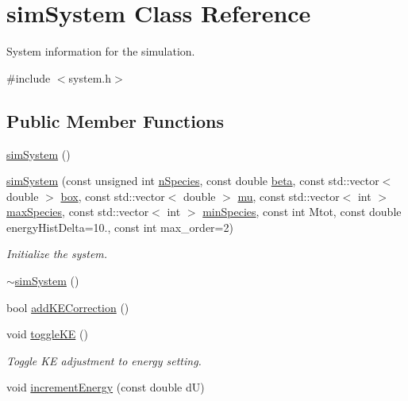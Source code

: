 \hypertarget{classsim_system}{\section{sim\-System Class Reference}
\label{classsim_system}
}


System information for the simulation.  




{\ttfamily \#include $<$system.\-h$>$}

\subsection*{Public Member Functions}
\begin{DoxyCompactItemize}
\item 
\hyperlink{classsim_system_a2312059f2775a063d02e5739721f7ece}{sim\-System} ()
\item 
\hyperlink{classsim_system_a1a5ca1d7704d8f26b3cb19ebba57e045}{sim\-System} (const unsigned int \hyperlink{classsim_system_ab5e2e9b6204de15520302fe1d51688dd}{n\-Species}, const double \hyperlink{classsim_system_a3eeec9678902f8d7fce4dad6064aaf4c}{beta}, const std\-::vector$<$ double $>$ \hyperlink{classsim_system_a8bff9dfb95b1b09a0fab2c1c485ade07}{box}, const std\-::vector$<$ double $>$ \hyperlink{classsim_system_af1e3f5320aff976a448647244d5950d1}{mu}, const std\-::vector$<$ int $>$ \hyperlink{classsim_system_a93259b517f449f1ac610d132ac66b551}{max\-Species}, const std\-::vector$<$ int $>$ \hyperlink{classsim_system_afafda4a09ed180ee9c5580d196d8ca9f}{min\-Species}, const int Mtot, const double energy\-Hist\-Delta=10., const int max\-\_\-order=2)
\begin{DoxyCompactList}\small\item\em Initialize the system. \end{DoxyCompactList}\item 
\hyperlink{classsim_system_abaa6ad6ea00aa437cf0b9ac8034af327}{$\sim$sim\-System} ()
\item 
bool \hyperlink{classsim_system_a09c4ea670168c9f1d549d2a5120eb13c}{add\-K\-E\-Correction} ()
\item 
void \hyperlink{classsim_system_aa5853448f04712e9163174860efadefd}{toggle\-K\-E} ()
\begin{DoxyCompactList}\small\item\em Toggle K\-E adjustment to energy setting. \end{DoxyCompactList}\item 
void \hyperlink{classsim_system_a6ad31c08955b80873f865b3069618dcb}{increment\-Energy} (const double d\-U)

\end{DoxyCompactItemize}
